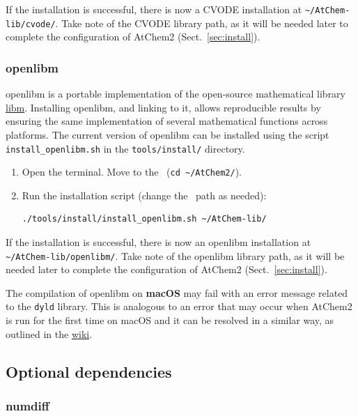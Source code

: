 If the installation is successful, there is now a CVODE installation at
\texttt{\textasciitilde/AtChem-lib/cvode/}. Take note of the CVODE library path, as it
will be needed later to complete the configuration of AtChem2 (Sect.~\ref{sec:install}).

\subsubsection{openlibm}

openlibm is a portable implementation of the open-source mathematical library
\href{https://openlibm.org}{libm}. Installing openlibm, and linking to it, allows
reproducible results by ensuring the same implementation of several mathematical
functions across platforms. The current version of openlibm can be installed using
the script \texttt{install\_openlibm.sh} in the \texttt{tools/install/} directory.

\begin{enumerate}
\item Open the terminal. Move to the \maindir\ (\verb|cd ~/AtChem2/|).
\item Run the installation script (change the \depdir\ path as needed):
  \begin{Verbatim}[fontsize=\small]
  ./tools/install/install_openlibm.sh ~/AtChem-lib/
  \end{Verbatim}
\end{enumerate}

If the installation is successful, there is now an openlibm installation at
\texttt{\textasciitilde/AtChem-lib/openlibm/}. Take note of the openlibm library path, as it
will be needed later to complete the configuration of AtChem2 (Sect.~\ref{sec:install}).

The compilation of openlibm on \textbf{macOS} may fail with an error message related to the
\texttt{dyld} library. This is analogous to an error that may occur when AtChem2 is run for the
first time on macOS and it can be resolved in a similar way, as outlined in the
\href{https://github.com/AtChem/AtChem2/wiki/Known-Issues}{wiki}.

\subsection{Optional dependencies} \label{subsec:optional-dependencies}

\subsubsection{numdiff}

